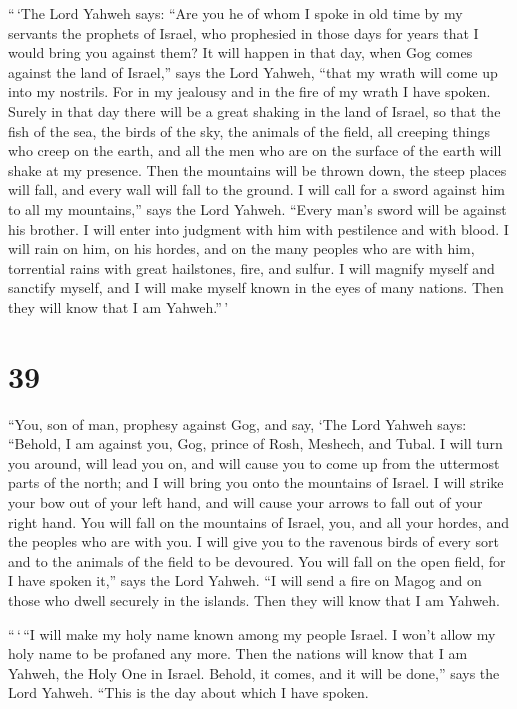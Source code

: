  ``\,`The Lord Yahweh says: ``Are you he of whom I spoke
in old time by my servants the prophets of Israel, who prophesied in
those days for years that I would bring you against them?
 It will happen in that day, when Gog comes against the
land of Israel,'' says the Lord Yahweh, ``that my wrath will come up
into my nostrils.  For in my jealousy and in the fire of
my wrath I have spoken. Surely in that day there will be a great shaking
in the land of Israel,  so that the fish of the sea, the
birds of the sky, the animals of the field, all creeping things who
creep on the earth, and all the men who are on the surface of the earth
will shake at my presence. Then the mountains will be thrown down, the
steep places will fall, and every wall will fall to the ground.
 I will call for a sword against him to all my
mountains,'' says the Lord Yahweh. ``Every man's sword will be against
his brother.  I will enter into judgment with him with
pestilence and with blood. I will rain on him, on his hordes, and on the
many peoples who are with him, torrential rains with great hailstones,
fire, and sulfur.  I will magnify myself and sanctify
myself, and I will make myself known in the eyes of many nations. Then
they will know that I am Yahweh.''\,'

\hypertarget{section-38}{%
\section{39}\label{section-38}}

 ``You, son of man, prophesy against Gog, and say, `The
Lord Yahweh says: ``Behold, I am against you, Gog, prince of Rosh,
Meshech, and Tubal.  I will turn you around, will lead you
on, and will cause you to come up from the uttermost parts of the north;
and I will bring you onto the mountains of Israel.  I will
strike your bow out of your left hand, and will cause your arrows to
fall out of your right hand.  You will fall on the
mountains of Israel, you, and all your hordes, and the peoples who are
with you. I will give you to the ravenous birds of every sort and to the
animals of the field to be devoured.  You will fall on the
open field, for I have spoken it,'' says the Lord Yahweh. 
``I will send a fire on Magog and on those who dwell securely in the
islands. Then they will know that I am Yahweh.

 ``\,`\,``I will make my holy name known among my people
Israel. I won't allow my holy name to be profaned any more. Then the
nations will know that I am Yahweh, the Holy One in Israel.
 Behold, it comes, and it will be done,'' says the Lord
Yahweh. ``This is the day about which I have spoken.

